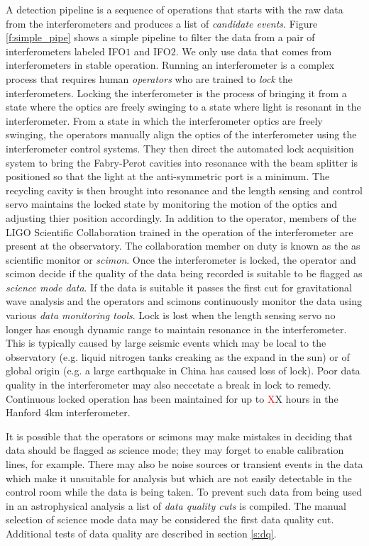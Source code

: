 A detection pipeline is a sequence of operations that starts with the raw data
from the interferometers and produces a list of \emph{candidate events}.
Figure \ref{f:simple_pipe} shows a simple pipeline to filter the data from a
pair of interferometers labeled IFO$1$ and IFO$2$.
We only use data that comes from interferometers in stable operation. Running
an interferometer is a complex process that requires human \emph{operators}
who are trained to \emph{lock} the interferometers. Locking the interferometer
is the process of bringing it from a state where the optics are freely
swinging to a state where light is resonant in the interferometer.  From a
state in which the interferometer optics are freely swinging, the operators
manually align the optics of the interferometer using the interferometer
control systems. They then direct the automated lock acquisition
system\cite{Evans:thesis} to bring the Fabry-Perot cavities into resonance
with the beam splitter is positioned so that the light at the anti-symmetric
port is a minimum. The recycling cavity is then brought into resonance and the
length sensing and control servo maintains the locked state by monitoring the
motion of the optics and adjusting thier position accordingly.   In addition
to the operator, members of the LIGO Scientific Collaboration trained in the
operation of the interferometer are present at the observatory. The
collaboration member on duty is known as the as scientific monitor or
\emph{scimon}. Once the interferometer is locked, the operator and scimon
decide if the quality of the data being recorded is suitable to be flagged as
\emph{science mode data}. If the data is suitable it passes the first cut for
gravitational wave analysis and the operators and scimons continuously monitor
the data using various \emph{data monitoring tools}\cite{DMT}. Lock is lost
when the length sensing servo no longer has enough dynamic range to maintain
resonance in the interferometer. This is typically caused by large seismic
events which may be local to the observatory (e.g. liquid nitrogen tanks
creaking as the expand in the sun) or of global origin (e.g. a large
earthquake in China has caused loss of lock). Poor data quality in the
interferometer may also neccetate a break in lock to remedy.  Continuous
locked operation has been maintained for up to {\textcolor{red} XX} hours in
the Hanford 4km interferometer.

It is possible that the operators or scimons may make mistakes in deciding
that data should be flagged as science mode; they may forget to enable
calibration lines, for example. There may also be noise sources or transient
events in the data which make it unsuitable for analysis but which are not
easily detectable in the control room while the data is being taken. To
prevent such data from being used in an astrophysical analysis a list of
\emph{data quality cuts} is compiled. The manual selection of science mode
data may be considered the first data quality cut.  Additional tests of data
quality are described in section \ref{s:dq}.

